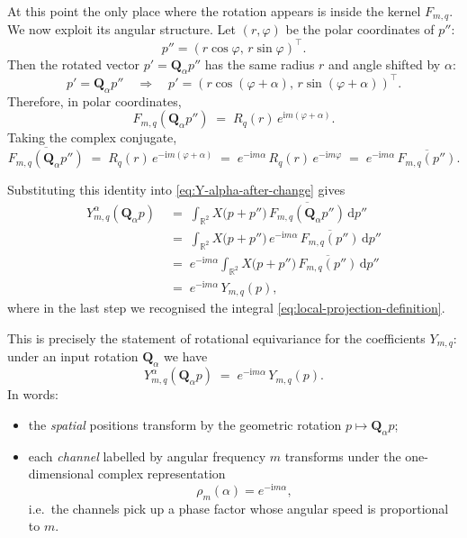 \documentclass[12pt]{article}
\begin{document}
At this point the only place where the rotation appears is inside the
kernel $F_{m,q}$. We now exploit its angular structure. Let
$(r,\varphi)$ be the polar coordinates of $p''$:
\[
  p'' = (r\cos\varphi,\,r\sin\varphi)^\top.
\]
Then the rotated vector $p' = \mathbf{Q}_\alpha p''$ has the same
radius $r$ and angle shifted by $\alpha$:
\[
  p' = \mathbf{Q}_\alpha p'' \quad\Longrightarrow\quad
  p' = (r\cos(\varphi + \alpha),\,r\sin(\varphi + \alpha))^\top.
\]
Therefore, in polar coordinates,
\[
  F_{m,q}(\mathbf{Q}_\alpha p'')
  \;=\;
  R_q(r)\, e^{\mathrm{i}m(\varphi + \alpha)}.
\]
Taking the complex conjugate,
\begin{equation}
  \label{eq:F-rotate-conjugate}
  \overline{F_{m,q}(\mathbf{Q}_\alpha p'')}
  \;=\;
  R_q(r)\, e^{-\mathrm{i}m(\varphi + \alpha)}
  \;=\;
  e^{-\mathrm{i}m\alpha}\,R_q(r)\,e^{-\mathrm{i}m\varphi}
  \;=\;
  e^{-\mathrm{i}m\alpha}\,\overline{F_{m,q}(p'')}.
\end{equation}

Substituting this identity into
\eqref{eq:Y-alpha-after-change} gives
\begin{align}
  Y^{\alpha}_{m,q}(\mathbf{Q}_\alpha p)
  \;&=\;
  \int_{\mathbb{R}^2}
    X\bigl(p + p''\bigr)\,
    \overline{F_{m,q}(\mathbf{Q}_\alpha p'')}\,
  \mathrm{d}p''
  \\
  \;&=\;
  \int_{\mathbb{R}^2}
    X\bigl(p + p''\bigr)\,
    e^{-\mathrm{i}m\alpha}\,\overline{F_{m,q}(p'')}\,
  \mathrm{d}p''
  \label{eq:Y-alpha-factor-phase}
  \\
  \;&=\;
  e^{-\mathrm{i}m\alpha}
  \int_{\mathbb{R}^2}
    X\bigl(p + p''\bigr)\,
    \overline{F_{m,q}(p'')}\,
  \mathrm{d}p''
  \\
  \;&=\;
  e^{-\mathrm{i}m\alpha}\,
  Y_{m,q}(p),
  \label{eq:Y-alpha-equivariant}
\end{align}
where in the last step we recognised the integral
\eqref{eq:local-projection-definition}.

This is precisely the statement of rotational equivariance for the
coefficients $Y_{m,q}$: under an input rotation $\mathbf{Q}_\alpha$ we have
\begin{equation}
  \label{eq:equivariance-statement}
  Y^{\alpha}_{m,q}(\mathbf{Q}_\alpha p)
  \;=\;
  e^{-\mathrm{i}m\alpha}\,Y_{m,q}(p).
\end{equation}
In words:
\begin{itemize}
  \item the \emph{spatial} positions transform by the geometric
    rotation $p \mapsto \mathbf{Q}_\alpha p$;
  \item each \emph{channel} labelled by angular frequency $m$
    transforms under the one-dimensional complex representation
    \[
      \rho_m(\alpha) = e^{-\mathrm{i}m\alpha},
    \]
    i.e.\ the channels pick up a phase factor whose angular speed is
    proportional to $m$.
\end{itemize}
\end{document}
